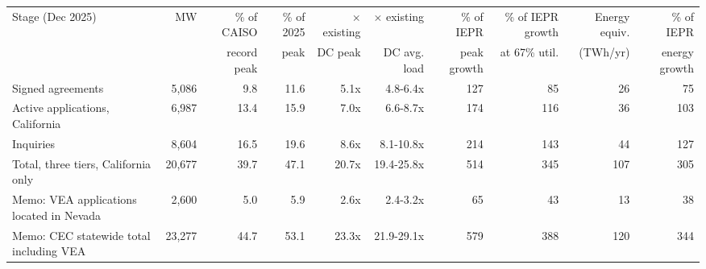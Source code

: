 \begin{tabular}{lrrrrrrrrr}
\toprule
Stage (Dec 2025) & MW & \% of CAISO & \% of 2025 & $\times$ existing & $\times$ existing & \% of IEPR & \% of IEPR growth & Energy equiv. & \% of IEPR \\
 & & record peak & peak & DC peak & DC avg. load & peak growth & at 67\% util. & (TWh/yr) & energy growth \\
\midrule
Signed agreements & 5,086 & 9.8 & 11.6 & 5.1x & 4.8-6.4x & 127 & 85 & 26 & 75 \\
Active applications, California & 6,987 & 13.4 & 15.9 & 7.0x & 6.6-8.7x & 174 & 116 & 36 & 103 \\
Inquiries & 8,604 & 16.5 & 19.6 & 8.6x & 8.1-10.8x & 214 & 143 & 44 & 127 \\
Total, three tiers, California only & 20,677 & 39.7 & 47.1 & 20.7x & 19.4-25.8x & 514 & 345 & 107 & 305 \\
\midrule
Memo: VEA applications located in Nevada & 2,600 & 5.0 & 5.9 & 2.6x & 2.4-3.2x & 65 & 43 & 13 & 38 \\
\midrule
Memo: CEC statewide total including VEA & 23,277 & 44.7 & 53.1 & 23.3x & 21.9-29.1x & 579 & 388 & 120 & 344 \\
\bottomrule
\end{tabular}
